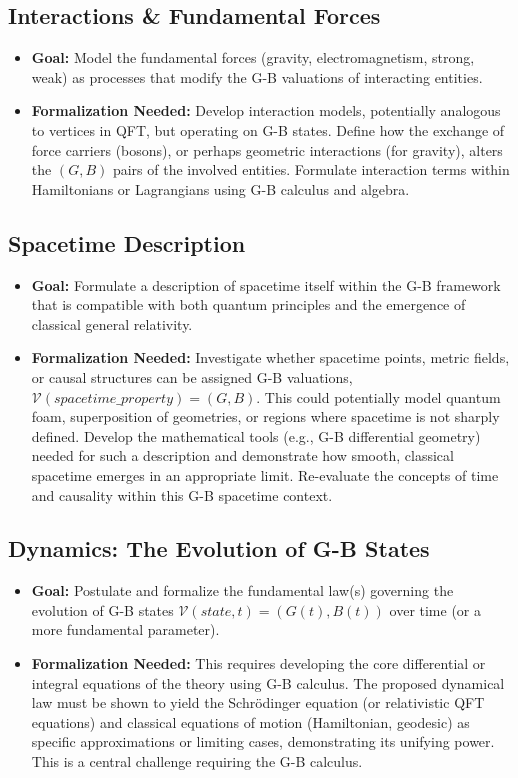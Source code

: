 \documentclass{article}
\begin{document}
\subsection{Interactions \& Fundamental Forces}
\begin{itemize}
    \item \textbf{Goal:} Model the fundamental forces (gravity, electromagnetism, strong, weak) as processes that modify the G-B valuations of interacting entities.
    \item \textbf{Formalization Needed:} Develop interaction models, potentially analogous to vertices in QFT, but operating on G-B states. Define how the exchange of force carriers (bosons), or perhaps geometric interactions (for gravity), alters the $(G, B)$ pairs of the involved entities. Formulate interaction terms within Hamiltonians or Lagrangians using G-B calculus and algebra.
\end{itemize}

\subsection{Spacetime Description}
\begin{itemize}
    \item \textbf{Goal:} Formulate a description of spacetime itself within the G-B framework that is compatible with both quantum principles and the emergence of classical general relativity.
    \item \textbf{Formalization Needed:} Investigate whether spacetime points, metric fields, or causal structures can be assigned G-B valuations, $\mathcal{V}(spacetime\_property) = (G, B)$. This could potentially model quantum foam, superposition of geometries, or regions where spacetime is not sharply defined. Develop the mathematical tools (e.g., G-B differential geometry) needed for such a description and demonstrate how smooth, classical spacetime emerges in an appropriate limit. Re-evaluate the concepts of time and causality within this G-B spacetime context.
\end{itemize}

\subsection{Dynamics: The Evolution of G-B States}
\begin{itemize}
    \item \textbf{Goal:} Postulate and formalize the fundamental law(s) governing the evolution of G-B states $\mathcal{V}(state, t) = (G(t), B(t))$ over time (or a more fundamental parameter).
    \item \textbf{Formalization Needed:} This requires developing the core differential or integral equations of the theory using G-B calculus. The proposed dynamical law must be shown to yield the Schrödinger equation (or relativistic QFT equations) and classical equations of motion (Hamiltonian, geodesic) as specific approximations or limiting cases, demonstrating its unifying power. This is a central challenge requiring the G-B calculus.
\end{itemize}
\end{document}
